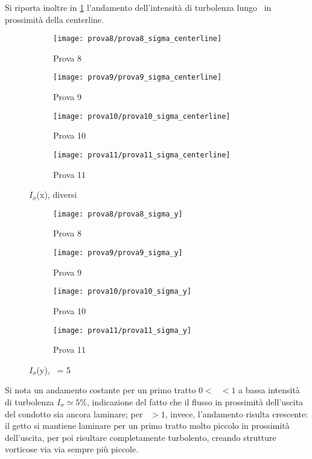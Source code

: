 \documentclass{article} %
\newcommand{\xd}{\nicefrac{\textrm{x}}{\textrm{D}}\ }
\newcommand{\yd}{\nicefrac{\textrm{y}}{\textrm{D}}\ }
\begin{document}
Si riporta inoltre in \cref{fig:sigma_centerline_8901} l'andamento dell'intensità di turbolenza lungo \xd in prossimità della centerline.\par
\begin{figure}[h!]
	\centering
	\begin{subfigure}[b]{0.24\textwidth}
		\texttt{[image: prova8/prova8\_sigma\_centerline]}
		\caption{Prova 8}
	\end{subfigure}
	\begin{subfigure}[b]{0.24\textwidth}
		\texttt{[image: prova9/prova9\_sigma\_centerline]}
		\caption{Prova 9}
	\end{subfigure}
	\begin{subfigure}[b]{0.24\textwidth}
		\texttt{[image: prova10/prova10\_sigma\_centerline]}
		\caption{Prova 10}
	\end{subfigure}
	\begin{subfigure}[b]{0.24\textwidth}
		\texttt{[image: prova11/prova11\_sigma\_centerline]}
		\caption{Prova 11}
	\end{subfigure}
	\caption{$I_{\sigma}$(x), diversi \yd}
	\label{fig:sigma_centerline_8901}
\end{figure}
\begin{figure}[h!]
	\centering
	\begin{subfigure}[b]{0.24\textwidth}
		\texttt{[image: prova8/prova8\_sigma\_y]}
		\caption{Prova 8}
	\end{subfigure}
	\begin{subfigure}[b]{0.24\textwidth}
		\texttt{[image: prova9/prova9\_sigma\_y]}
		\caption{Prova 9}
	\end{subfigure}
	\begin{subfigure}[b]{0.24\textwidth}
		\texttt{[image: prova10/prova10\_sigma\_y]}
		\caption{Prova 10}
	\end{subfigure}
	\begin{subfigure}[b]{0.24\textwidth}
		\texttt{[image: prova11/prova11\_sigma\_y]}
		\caption{Prova 11}
	\end{subfigure}
	\caption{$I_{\sigma}$(y), \xd= 5}
	\label{fig:sigma_y_8901}
\end{figure}
Si nota un andamento costante per un primo tratto $0<\ $\xd$<1$ a bassa intensità di turbolenza $I_\sigma\simeq 5\%$, indicazione del fatto che il flusso in prossimità dell'uscita del condotto sia ancora laminare; per \xd $>1$, invece, l'andamento risulta crescente: il getto si mantiene laminare per un primo tratto molto piccolo in prossimità dell'uscita, per poi risultare completamente turbolento, creando strutture vorticose via via sempre più piccole.\par
\end{document}
